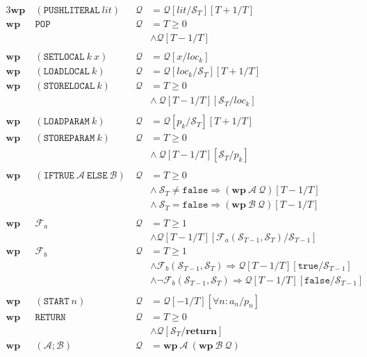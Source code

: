\documentclass[a4paper]{article}
\newcommand{\Q}{\mathcal{Q}}
\newcommand{\A}{\mathcal{A}}
\newcommand{\B}{\mathcal{B}}
\renewcommand{\wp}{\mathbf{wp}}
\newcommand{\stack}[1]{\mathcal{S}_{#1}}
\begin{document}
\begin{alignat*}{3}
\wp\ &(\mathtt{PUSHLITERAL}\ lit)\ &\Q &= \Q[lit / \stack{T}][T + 1 / T]\\
\wp\ &\mathtt{POP}\ &\Q &= T \geq 0\\
&&&\wedge \Q[T - 1 / T]\\\\
\wp\ &(\mathtt{SETLOCAL}\ k\ x)\ &\Q &= \Q[x / loc_k]\\
\wp\ &(\mathtt{LOADLOCAL}\ k)\ &\Q &= \Q[loc_k / \stack{T}][T + 1 / T]\\
\wp\ &(\mathtt{STORELOCAL}\ k)\ &\Q &= T \geq 0\\
&&&\wedge\ \Q[T - 1 / T][\stack{T} / loc_k]\\\\
\wp\ &(\mathtt{LOADPARAM}\ k)\ &\Q &= \Q[p_k / \stack{T}][T + 1 / T]\\
\wp\ &(\mathtt{STOREPARAM}\ k)\ &\Q &= T \geq 0\\
&&&\wedge\ \Q[T - 1 / T][\stack{T} / p_k]\\\\
\wp\ &(\mathtt{IFTRUE}\ \A\ \mathtt{ELSE}\ \B)\ &\Q &= T \geq 0\\
&&&\wedge\ \stack{T} \neq \mathtt{false} \Rightarrow (\wp\ \A\ \Q)[T - 1 / T]\\
&&&\wedge\ \stack{T} = \mathtt{false} \Rightarrow (\wp\ \B\ \Q)[T - 1 / T]\\\\
\wp\ &\mathcal{F}_a\ &\Q &= T \geq 1\\
&&&\wedge \Q[T - 1 / T][\mathcal{F}_a(\stack{T-1}, \stack{T}) / \stack{T-1}]\\
\wp\ &\mathcal{F}_b\ &\Q &= T \geq 1\\
&&&\wedge \mathcal{F}_b(\stack{T-1}, \stack{T}) \Rightarrow \Q[T - 1 / T][\mathtt{true} / \stack{T-1}]\\
&&&\wedge \neg \mathcal{F}_b(\stack{T-1}, \stack{T}) \Rightarrow \Q[T - 1 / T][\mathtt{false} / \stack{T-1}]\\\\
\wp\ &(\mathtt{START}\ n)\ &\Q &= \Q[-1 / T][\forall n : a_n / p_n]\\
\wp\ &\mathtt{RETURN}\ &\Q &= T \geq 0\\
&&&\wedge \Q[\stack{T} / \mathbf{return}]\\
\wp\ &(\A; \B)\ &\Q &= \wp\ \A\ (\wp\ \B\ \Q)
\end{alignat*}
\end{document}
